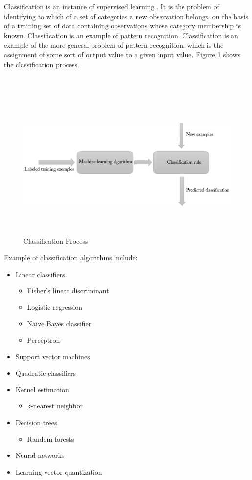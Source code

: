 Classification is an instance of supervised learning \cite{cite22}. It is the problem of identifying to which of a set of categories a new observation belongs, on the basis of a training set of data containing observations  whose category membership is known. Classification is an example of pattern recognition. Classification is an example of the more general problem of pattern recognition, which is the assignment of some sort of output value to a given input value. Figure \ref{classification} shows the classification process.\\
~\\ ~\\
\begin{figure}[H]
\begin{center}
\includegraphics[width=16.5cm,height=7.5cm]{chapter2prime/fig3.png}
\end{center}
\caption{Classification Process}
\label{classification}
\end{figure}
\newpage
Example of classification algorithms include:
\begin{itemize}
\item Linear classifiers
\begin{itemize}
\item Fisher's linear discriminant
\item Logistic regression
\item Naive Bayes classifier
\item Perceptron
\end{itemize}
\item Support vector machines
\item Quadratic classifiers
\item Kernel estimation
\begin{itemize}
\item k-nearest neighbor
\end{itemize}
\item Decision trees
\begin{itemize}
\item Random forests 
\end{itemize}
\item Neural networks
\item Learning vector quantization
\end{itemize}

